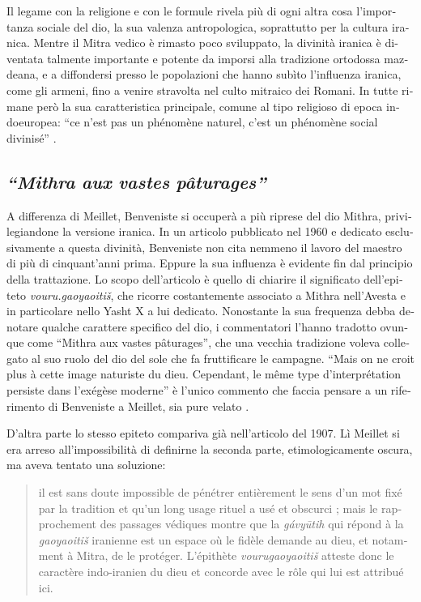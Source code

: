 \documentclass[output=paper]{../langscibook}
\begin{document}
\begin{otherlanguage}{italian}
Il legame con la religione e con le formule rivela più di ogni altra cosa l’importanza sociale del dio, la sua valenza antropologica, soprattutto per la cultura iranica. Mentre il Mitra vedico è rimasto poco sviluppato, la divinità iranica è diventata talmente importante e potente da imporsi alla tradizione ortodossa mazdeana, e a diffondersi presso le popolazioni che hanno subìto l’influenza iranica, come gli armeni, fino a venire stravolta nel culto mitraico dei Romani. In tutte rimane però la sua caratteristica principale, comune al tipo religioso di epoca indoeuropea: “ce n’est pas un phénomène naturel, c’est un phénomène social divinisé” \citep[159]{meillet_dieu_1907-1}.

\subsection{\textit{“Mithra} \textit{aux} \textit{vastes} \textit{pâturages”}}

A differenza di Meillet, Benveniste si occuperà a più riprese del dio Mithra, privilegiandone la versione iranica. In un articolo pubblicato nel 1960 e dedicato esclusivamente a questa divinità, Benveniste non cita nemmeno il lavoro del maestro di più di cinquant’anni prima. Eppure la sua influenza è evidente fin dal principio della trattazione. Lo scopo dell’articolo è quello di chiarire il significato dell’epiteto \textit{vouru.gaoyaoitiš}, che ricorre costantemente associato a Mithra nell’Avesta e in particolare nello Yasht X a lui dedicato. Nonostante la sua frequenza debba denotare qualche carattere specifico del dio, i commentatori l’hanno tradotto ovunque come “Mithra aux vastes pâturages”, che una vecchia tradizione voleva collegato al suo ruolo del dio del sole che fa fruttificare le campagne. “Mais on ne croit plus à cette image naturiste du dieu. Cependant, le même type d’interprétation persiste dans l’exégèse moderne” è l’unico commento che faccia pensare a un riferimento di Benveniste a Meillet, sia pure velato \citep[277]{benveniste_mithra_2015}.

D’altra parte lo stesso epiteto compariva già nell’articolo del 1907. Lì Meillet si era arreso all’impossibilità di definirne la seconda parte, etimologicamente oscura, ma aveva tentato una soluzione:

\begin{quote}
il est sans doute impossible de pénétrer entièrement le sens d’un mot fixé par la tradition et qu’un long usage rituel a usé et obscurci ; mais le rapprochement des passages védiques montre que la \textit{gávyūtih} qui répond à la \textit{gaoyaoitiš} iranienne est un espace où le fidèle demande au dieu, et notamment à Mitra, de le protéger. L’épithète \textit{vourugaoyaoitiš} atteste donc le caractère indo-iranien du dieu et concorde avec le rôle qui lui est attribué ici. \citep[156]{meillet_dieu_1907-1}
\end{quote}


\end{otherlanguage}
\end{document}
